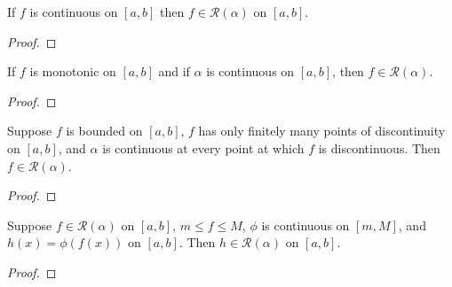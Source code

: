\begin{theorem}
If $f$ is continuous on $[a,b]$ then $f\in \mathscr{R}(\alpha)$ on $[a,b]$.
\end{theorem}
\begin{proof}

\end{proof}

\begin{theorem}
If $f$ is monotonic on $[a,b]$ and if $\alpha$ is continuous on $[a,b]$, then $f\in \mathscr{R}(\alpha)$.
\end{theorem}
\begin{proof}

\end{proof}

\begin{theorem}
Suppose $f$ is bounded on $[a,b]$, $f$ has only finitely many points of discontinuity on $[a,b]$, and $\alpha$ is continuous at every point at which $f$ is discontinuous. Then $f\in \mathscr{R}(\alpha)$.
\end{theorem}
\begin{proof}

\end{proof}

\begin{theorem}
Suppose $f\in \mathscr{R}(\alpha)$ on $[a,b]$, $m\leq f\leq M$, $\phi$ is continuous on $[m,M]$, and $h(x)=\phi(f(x))$ on $[a,b]$. Then $h\in \mathscr{R}(\alpha)$ on $[a,b]$.
\end{theorem}
\begin{proof}

\end{proof}

\clearpage